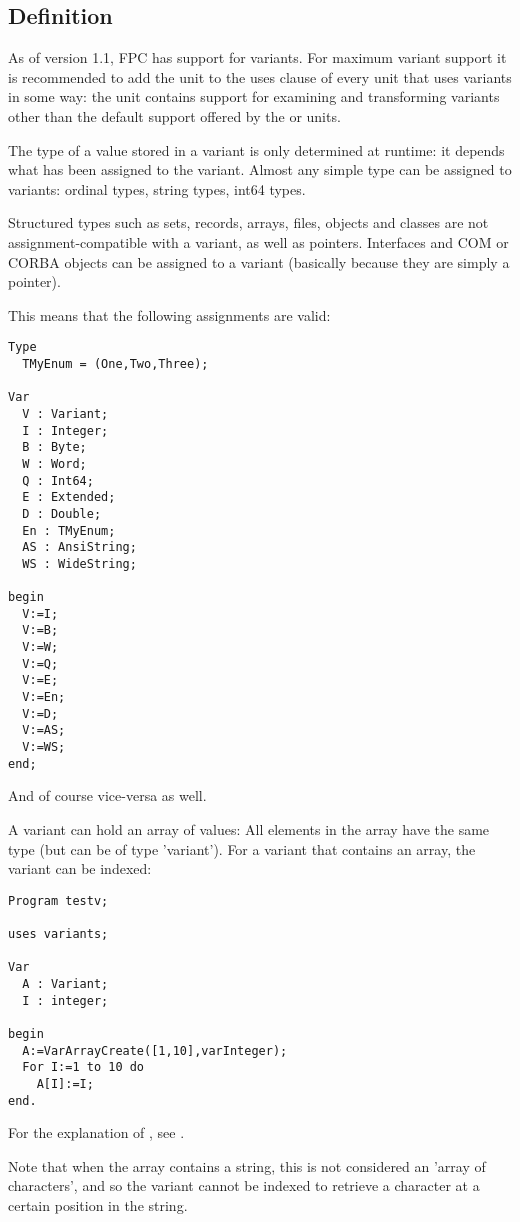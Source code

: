 \subsection{Definition}
As of version 1.1, FPC has support for variants. For maximum variant support 
it is recommended to add the  unit to the uses clause of every 
unit that uses variants in some way: the  unit contains support for
examining and transforming variants other than the default support offered
by the  or  units.

The type of a value stored in a variant is only determined at runtime: 
it depends what has been assigned to the variant. Almost any simple type 
can be assigned to variants: ordinal types, string types, int64 types.

Structured types such as sets, records, arrays, files, objects and classes 
are not assignment-compatible with a variant, as well as pointers. 
Interfaces and COM or CORBA objects can be assigned to a
variant (basically because they are simply a pointer).

This means that the following assignments are valid:
\begin{verbatim}
Type
  TMyEnum = (One,Two,Three);

Var
  V : Variant;
  I : Integer;
  B : Byte;
  W : Word;
  Q : Int64;
  E : Extended;
  D : Double;
  En : TMyEnum;
  AS : AnsiString;
  WS : WideString;

begin
  V:=I;
  V:=B;
  V:=W;
  V:=Q;
  V:=E;
  V:=En;
  V:=D;
  V:=AS;
  V:=WS;
end;
\end{verbatim}
And of course vice-versa as well.

A variant can hold an array of values: All elements in the array have
the same type (but can be of type 'variant'). For a variant 
that contains an array, the variant can be indexed:
\begin{verbatim}
Program testv;

uses variants;

Var
  A : Variant;
  I : integer;

begin
  A:=VarArrayCreate([1,10],varInteger);
  For I:=1 to 10 do
    A[I]:=I;
end.
\end{verbatim}
For the explanation of , see \unitsref.

Note that when the array contains a string, this is not considered an 'array
of characters', and so the variant cannot be indexed to retrieve a character
at a certain position in the string.


